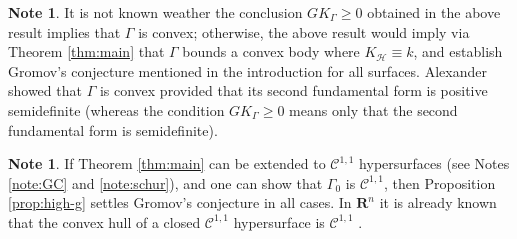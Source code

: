 \documentclass[11pt]{amsart}
\makeatletter
\theoremstyle{definition}
\newtheorem{note}[theorem]{Note}
\newcommand{\R}{\mathbf{R}}
\newcommand{\C}{\mathcal{C}}
\newcommand{\arc@char}{{\usefont{U}{tipa}{m}{n}\symbol{62}}}%
\newcommand{\arc}[1]{\mathpalette\arc@arc{#1}}
\newcommand{\arc@arc}[2]{%
  \sbox0{$\m@th#1#2$}%
  \vbox{
    \hbox{\resizebox{\wd0}{\height}{\arc@char}}
    \nointerlineskip
    \box0
  }%
}
\makeatother
\begin{document}
\begin{note}
It is not known weather the conclusion $GK_\Gamma\geq 0$ obtained in the above result implies that $\Gamma$ is convex; otherwise, the above result would imply via Theorem \ref{thm:main} that $\Gamma$ bounds a convex body where $K_\mathcal{H}\equiv k$, and establish Gromov's conjecture mentioned in the introduction for all surfaces. Alexander \cite{alexander1977} showed that $\Gamma$ is convex provided that its second fundamental form is positive semidefinite (whereas the condition $GK_\Gamma\geq 0$ means only that the second fundamental form is semidefinite).
\end{note}

\begin{note}
If Theorem \ref{thm:main} can be extended to $\C^{1,1}$ hypersurfaces (see Notes \ref{note:GC} and \ref{note:schur}), and one can show that $\Gamma_0$ is $\C^{1,1}$, then Proposition \ref{prop:high-g} settles Gromov's conjecture in all cases. In $\R^n$ it is already known that the convex hull of a closed $\C^{1,1}$ hypersurface is $\C^{1,1}$ \cite[Note 6.8]{ghomi-spruck2022}.
\end{note}



\begin{comment}
\begin{note}
Let $\Gamma_0$ denote the boundary of the convex hull of $\Gamma$. Here we show
 $\Gamma$ is a closed $\C^1$ closed immersed surface in $\mathcal{H}^3$. Then $\Gamma_0$ is $\C^1$.
It suffices to show that the tangent cone $T_p\Gamma_0$ at each point $p$ of $\Gamma_0$ is flat. Borbely \cite{borbely1995} showed that this is the case if $p$ does not lie on a geodesic with end points on $\Gamma$. Suppose then that such a geodesic, say $g$, passes through $p$, with an end points $q$, $q'$ on $\Gamma$. Suppose, towards a contradiction, that $T_p\Gamma_0$ is not a plane. Since $T_p\Gamma_0$ is a convex hypersurface in $T_p \mathcal{H}^3$, there passes a pair of different support hyperplanes $\arc H$, $\arc H'$ of $T_p\Gamma_0$ through $p$ in $T_p \mathcal{H}^3$. Let $H$, $H'$ be the images of these hyperplanes under  $\exp_p$. Then $H$, $H'$ are complete hypersurfaces in $\mathcal{H}^3$ which support $\Gamma_0$ at $p$. 
Since $g\subset\Gamma_0$, and $p$ is an interior point of $g$, it follows that $g\subset H\cap H'$. Thus
$H$, $H'$ pass through $q$. Note that $\arc H$ and $\arc H'$ are transversal along the line passing through $p$ and $\exp^{-1}(q)$. Thus, since $\exp_p$ is a diffeomorphism, it follows that $H$ and $H'$ are transversal along  $g$ and in particular at $q$. Thus $T_q \Gamma$ cannot be a flat, which contradicts the differentiability assumption on $\Gamma$.
\end{note}
\end{comment}
\end{document}
